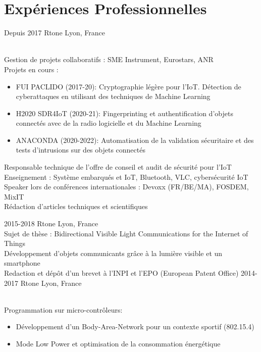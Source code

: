 \documentclass[]{cv-style}          %
\begin{document}
\section{Expériences Professionnelles}

\begin{entrylist}
\entry
  {Depuis 2017}
  {Rtone}
  {Lyon, France}
  {\\
  Gestion de projets collaboratifs : SME Instrument, Eurostars, ANR\\
  Projets en cours :
\begin{itemize}
    \item FUI PACLIDO (2017-20): Cryptographie légère pour l'IoT. Détection de cyberattaques en utilisant des techniques de Machine Learning
    \item H2020 SDR4IoT (2020-21): Fingerprinting et authentification d'objets connectés avec de la radio logicielle et du Machine Learning
    \item ANACONDA (2020-2022): Automatisation de la validation sécuritaire et des tests d'intrusions sur des objets connectés
\end{itemize}
Responsable technique de l'offre de conseil et audit de sécurité pour l'IoT\\
Enseignement : Système embarqués et IoT, Bluetooth, VLC, cybersécurité IoT\\
Speaker lors de conférences internationales : Devoxx (FR/BE/MA), FOSDEM, MixIT\\
Rédaction d'articles techniques et scientifiques
}
\entry
  {2015-2018}
  {Rtone}
  {Lyon, France}
  {\\
  Sujet de thèse : Bidirectional Visible Light Communications for the Internet of Things\\ 
  Développement d'objets communicants grâce à la lumière visible et un smartphone\\
  Redaction et dépôt d'un brevet à l'INPI et l'EPO (European Patent Office)
 }
\entry
  {2014-2017}
  {Rtone}
  {Lyon, France}
  {\\
  Programmation sur micro-contrôleurs:
  \begin{itemize}
    \item Développement d'un Body-Area-Network pour un contexte sportif (802.15.4)
    \item Mode Low Power et optimisation de la consommation énergétique

\end{itemize}}
\end{entrylist}
\end{document}
